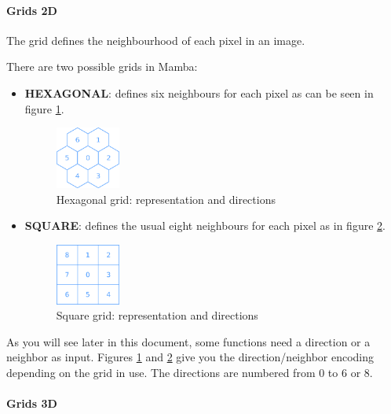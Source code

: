 \documentclass[a4paper,10pt,oneside]{article}
\begin{document}
\paragraph{Grids 2D}

The grid defines the neighbourhood of each pixel in an image.

There are two possible grids in Mamba:

\begin{itemize}
\item \textbf{HEXAGONAL}: defines six neighbours for each pixel as can be seen in 
figure \ref{fig:hxgriddir}.

\begin{figure}
\centering
\includegraphics[width=0.2\textwidth]{figures/hexa_grid.pdf}
\caption{Hexagonal grid: representation and directions}
\label{fig:hxgriddir}
\end{figure}

\item \textbf{SQUARE}: defines the usual eight neighbours for each pixel as
in figure \ref{fig:sqgriddir}.

\begin{figure}
\centering
\includegraphics[width=0.2\textwidth]{figures/square_grid.pdf}
\caption{Square grid: representation and directions}
\label{fig:sqgriddir}
\end{figure}

\end{itemize}

As you will see later in this document, some functions need a direction or a 
neighbor as input. Figures \ref{fig:hxgriddir} and \ref{fig:sqgriddir} give you
the direction/neighbor encoding depending on the grid in use. The directions
are numbered from 0 to 6 or 8.

\paragraph{Grids 3D}
\end{document}
